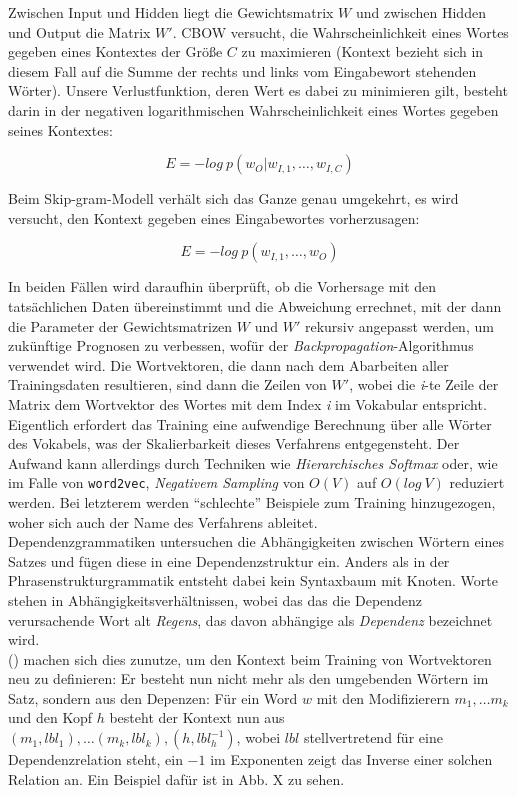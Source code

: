   Zwischen Input und Hidden liegt die Gewichtsmatrix $W$ und zwischen Hidden und Output die Matrix $W'$.
  CBOW versucht, die Wahrscheinlichkeit eines Wortes gegeben eines Kontextes
  der Größe $C$ zu maximieren (Kontext bezieht sich in diesem Fall auf die Summe der rechts und links vom Eingabewort stehenden
  Wörter). Unsere Verlustfunktion, deren Wert es dabei zu minimieren gilt, besteht darin in der negativen logarithmischen
  Wahrscheinlichkeit eines Wortes gegeben seines Kontextes:

  \begin{equation}
    E = - log\ p(w_O | w_{I,1}, \ldots, w_{I,C})
  \end{equation}

  Beim Skip-gram-Modell verhält sich das Ganze genau umgekehrt, es wird versucht, den Kontext gegeben eines Eingabewortes
  vorherzusagen:

  \begin{equation}
    E = - log\ p(w_{I,1}, \ldots, w_O)
  \end{equation}

  In beiden Fällen wird daraufhin überprüft, ob die Vorhersage mit den tatsächlichen Daten übereinstimmt und die Abweichung
  errechnet, mit der dann die Parameter der Gewichtsmatrizen $W$ und $W'$ rekursiv angepasst werden, um zukünftige Prognosen
  zu verbessen, wofür der \emph{Backpropagation}-Algorithmus verwendet wird. Die Wortvektoren, die dann nach dem Abarbeiten aller Trainingsdaten resultieren, sind dann die Zeilen von
  $W'$, wobei die \emph{i}-te Zeile der Matrix dem Wortvektor des Wortes mit dem Index \emph{i} im Vokabular entspricht.\\
  Eigentlich erfordert das Training eine aufwendige Berechnung über alle Wörter des Vokabels, was der Skalierbarkeit dieses
  Verfahrens entgegensteht. Der Aufwand kann allerdings durch Techniken wie \emph{Hierarchisches Softmax} oder, wie im
  Falle von \verb|word2vec|, \emph{Negativem Sampling} von $O(V)$ auf $O(log\ V)$ reduziert werden. Bei letzterem
  werden ``schlechte'' Beispiele zum Training hinzugezogen, woher sich auch der Name des Verfahrens ableitet.\\

  Dependenzgrammatiken untersuchen die Abhängigkeiten zwischen Wörtern eines Satzes und fügen diese in eine Dependenzstruktur ein.
  Anders als in der Phrasenstrukturgrammatik entsteht dabei kein Syntaxbaum mit Knoten. Worte stehen in Abhängigkeitsverhältnissen,
  wobei das das die Dependenz verursachende Wort alt \emph{Regens}, das davon abhängige als \emph{Dependenz} bezeichnet wird.\\
  (\citeauthor{levy2014dependency}) machen sich dies zunutze, um den Kontext beim Training von Wortvektoren neu zu definieren:
  Er besteht nun nicht mehr als den umgebenden Wörtern im Satz, sondern aus den Depenzen: Für ein Word $w$ mit den Modifizierern
  $m_1, \ldots m_k$ und den Kopf $h$ besteht der Kontext nun aus $(m_1, lbl_1), \ldots (m_k, lbl_k), (h, lbl_h^{-1})$, wobei
  $lbl$ stellvertretend für eine Dependenzrelation steht, ein $-1$ im Exponenten zeigt das Inverse einer solchen Relation an.
  Ein Beispiel dafür ist in Abb. X zu sehen.\\

